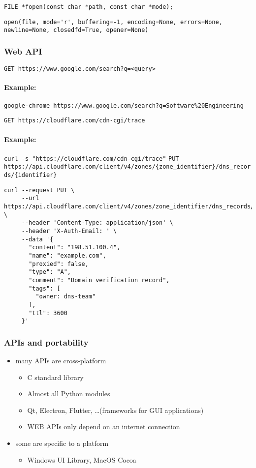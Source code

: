 \documentclass[12pt]{article}
\begin{document}
\verb|FILE *fopen(const char *path, const char *mode);|

\verb|open(file, mode='r', buffering=-1, encoding=None, errors=None, newline=None, closedfd=True, opener=None)|

\subsubsection{Web API}

\verb|GET https://www.google.com/search?q=<query>|

\paragraph{Example:}

\verb|google-chrome https://www.google.com/search?q=Software%20Engineering|

\verb|GET https://cloudflare.com/cdn-cgi/trace|

\paragraph{Example:}

\verb|curl -s "https://cloudflare.com/cdn-cgi/trace"|
\texttt{PUT https://api.cloudflare.com/client/v4/zones/\{zone\_identifier\}/dns\_records/\{identifier\}}

\begin{lstlisting}
curl --request PUT \
     --url https://api.cloudflare.com/client/v4/zones/zone_identifier/dns_records/identifier \
     --header 'Content-Type: application/json' \
     --header 'X-Auth-Email: ' \
     --data '{
       "content": "198.51.100.4",
       "name": "example.com",
       "proxied": false,
       "type": "A",
       "comment": "Domain verification record",
       "tags": [
         "owner: dns-team"
       ],
       "ttl": 3600
     }'
\end{lstlisting}
\subsubsection{APIs and portability}
\begin{itemize}
  \item many APIs are cross-platform
  \begin{itemize}
    \item C standard library
    \item Almost all Python modules
    \item Qt, Electron, Flutter, \ldots (frameworks for GUI applications)
    \item WEB APIs only depend on an internet connection
  \end{itemize}
  \item some are specific to a platform
  \begin{itemize}
    \item Windows UI Library, MacOS Cocoa
  \end{itemize}
\end{itemize}
\end{document}
